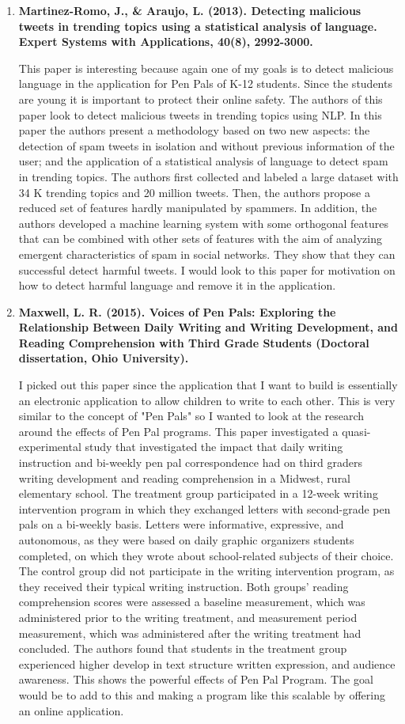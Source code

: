 \documentclass[12pt, final]{article}
\begin{document}
\begin{enumerate}
\item \textbf{Martinez-Romo, J., \& Araujo, L. (2013). Detecting malicious tweets in trending topics using a statistical analysis of language. Expert Systems with Applications, 40(8), 2992-3000.}

This paper is interesting because again one of my goals is to detect malicious language in the application for Pen Pals of K-12 students. Since the students are young it is important to protect their online safety. The authors of this paper look to detect malicious tweets in trending topics using NLP. In this paper the authors present a methodology based on two new aspects: the detection of spam tweets in isolation and without previous information of the user; and the application of a statistical analysis of language to detect spam in trending topics. The authors first collected and labeled a large dataset with 34 K trending topics and 20 million tweets. Then, the authors propose a reduced set of features hardly manipulated by spammers. In addition, the authors developed a machine learning system with some orthogonal features that can be combined with other sets of features with the aim of analyzing emergent characteristics of spam in social networks. They show that they can successful detect harmful tweets. I would look to this paper for motivation on how to detect harmful language and remove it in the application.


\item \textbf{Maxwell, L. R. (2015). Voices of Pen Pals: Exploring the Relationship Between Daily Writing and Writing Development, and Reading Comprehension with Third Grade Students (Doctoral dissertation, Ohio University).}

I picked out this paper since the application that I want to build is essentially an electronic application to allow children to write to each other. This is very similar to the concept of "Pen Pals" so I wanted to look at the research around the effects of Pen Pal programs. This paper investigated a quasi-experimental study that investigated the impact that daily writing instruction and bi-weekly pen pal correspondence had on third graders writing development and reading comprehension in a Midwest, rural elementary school. The treatment group participated in a 12-week writing intervention program in which they exchanged letters with second-grade pen pals on a bi-weekly basis. Letters were informative, expressive, and autonomous, as they were based on daily graphic organizers students completed, on which they wrote about school-related subjects of their choice. The control group did not participate in the writing intervention program, as they received their typical writing instruction. Both groups' reading comprehension scores were assessed a baseline measurement, which was administered prior to the writing treatment, and measurement period measurement, which was administered after the writing treatment had concluded. The authors found that students in the treatment group experienced higher develop in text structure written expression, and audience awareness. This shows the powerful effects of Pen Pal Program. The goal would be to add to this and making a program like this scalable by offering an online application.


\end{enumerate}
\end{document}
